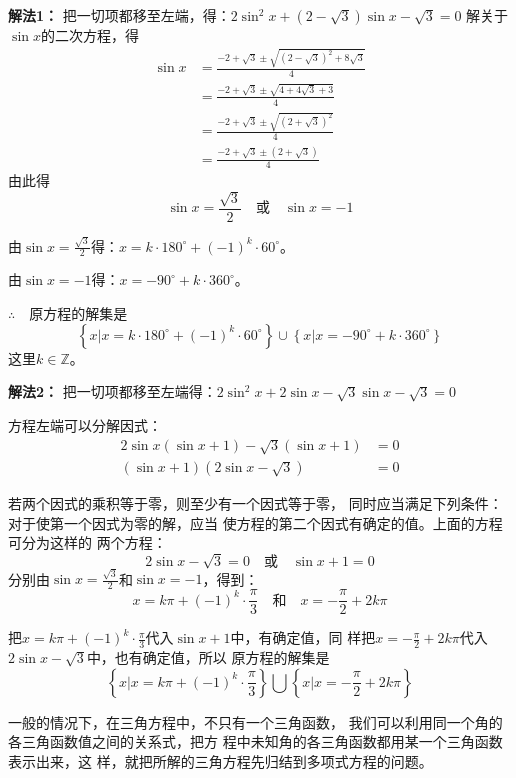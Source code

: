 \begin{solution}
\textbf{解法1：} 把一切项都移至左端，得：$2\sin^2x+\left(2-\sqrt{3}\right)\sin x-\sqrt{3}=0$
解关于$\sin x$的二次方程，得
\[\begin{split}
\sin x&=\frac{-2+\sqrt{3}\pm \sqrt{\left(2-\sqrt{3}\right)^2+8\sqrt{3}}}{4}\\
&=\frac{-2+\sqrt{3}\pm \sqrt{4+4\sqrt{3}+3}}{4}\\
&=\frac{-2+\sqrt{3}\pm \sqrt{\left(2+\sqrt{3}\right)^2}}{4}\\
&=\frac{-2+\sqrt{3}\pm \left(2+\sqrt{3}\right)}{4}
\end{split}\]
由此得
\[\sin x=\frac{\sqrt{3}}{2}\quad \text{或}\quad \sin x=-1\]

由$\sin x=\frac{\sqrt{3}}{2}$得：$x=k\cdot 180^{\circ}+(-1)^k\cdot 60^{\circ}$。

由$\sin x=-1$得：$x=-90^{\circ}+k\cdot 360^{\circ}$。

$\therefore\quad $原方程的解集是
\[\left\{x|x=k\cdot 180^{\circ}+(-1)^k\cdot 60^{\circ}\right\}\cup \left\{x|x=-90^{\circ}+k\cdot 360^{\circ}\right\}\]
这里$k\in\mathbb{Z}$。

\textbf{解法2：} 把一切项都移至左端得：$2\sin^2x+2\sin x-\sqrt{3}\sin x-\sqrt{3}=0$

方程左端可以分解因式：
\[\begin{split}
    2\sin x(\sin x+1)-\sqrt{3}(\sin x+1)&=0\\
    (\sin x+1)\left(2\sin x-\sqrt{3}\right)&=0
\end{split}\]

若两个因式的乘积等于零，则至少有一个因式等于零，
同时应当满足下列条件：对于使第一个因式为零的解，应当
使方程的第二个因式有确定的值。上面的方程可分为这样的
两个方程：
\[2\sin x-\sqrt{3}=0\quad \text{或}\quad \sin x+1=0\]
分别由$\sin x=\frac{\sqrt{3}}{2} $和$\sin x=-1$，得到：
\[x=k\pi+(-1)^k \cdot\frac{\pi}{3}\quad \text{和}\quad x=-\frac{\pi}{2}+2k\pi\]

把$x=k\pi+(-1)^k \cdot\frac{\pi}{3}$代入$\sin x+1$中，有确定值，同
样把$x=-\frac{\pi}{2}+2k\pi$代入$2\sin x-\sqrt{3}$中，也有确定值，所以
原方程的解集是
\[\left\{x\Big|x=k\pi+(-1)^k \cdot\frac{\pi}{3}\right\}\bigcup \left\{x\Big|x=-\frac{\pi}{2}+2k\pi\right\}\]
\end{solution}

一般的情况下，在三角方程中，不只有一个三角函数，
我们可以利用同一个角的各三角函数值之间的关系式，把方
程中未知角的各三角函数都用某一个三角函数表示出来，这
样，就把所解的三角方程先归结到多项式方程的问题。

